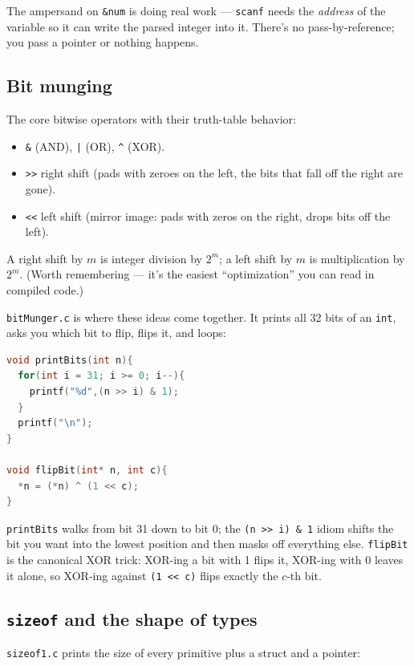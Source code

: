 \documentclass[11pt]{article}
\begin{document}
The ampersand on \texttt{\&num} is doing real work --- \texttt{scanf}
needs the \emph{address} of the variable so it can write the parsed
integer into it. There's no pass-by-reference; you pass a pointer or
nothing happens.

\subsection*{Bit munging}

The core bitwise operators with their truth-table behavior:
\begin{itemize}
  \item \texttt{\&} (AND), \texttt{|} (OR), \texttt{\^{}} (XOR).
  \item \texttt{>>} right shift (pads with zeroes on the left, the
    bits that fall off the right are gone).
  \item \texttt{<<} left shift (mirror image: pads with zeros on the
    right, drops bits off the left).
\end{itemize}

A right shift by $m$ is integer division by $2^m$; a left shift by $m$
is multiplication by $2^m$. (Worth remembering --- it's the easiest
``optimization'' you can read in compiled code.)

\texttt{bitMunger.c} is where these ideas come together. It prints all
32 bits of an \texttt{int}, asks you which bit to flip, flips it, and
loops:

\begin{lstlisting}[language=C]
void printBits(int n){
  for(int i = 31; i >= 0; i--){
    printf("%d",(n >> i) & 1);
  }
  printf("\n");
}

void flipBit(int* n, int c){
  *n = (*n) ^ (1 << c);
}
\end{lstlisting}

\texttt{printBits} walks from bit 31 down to bit 0; the
\texttt{(n >> i) \& 1} idiom shifts the bit you want into the lowest
position and then masks off everything else. \texttt{flipBit} is the
canonical XOR trick: XOR-ing a bit with 1 flips it, XOR-ing with 0
leaves it alone, so XOR-ing against \texttt{(1 << c)} flips exactly
the $c$-th bit.

\subsection*{\texttt{sizeof} and the shape of types}

\texttt{sizeof1.c} prints the size of every primitive plus a struct
and a pointer:
\end{document}
